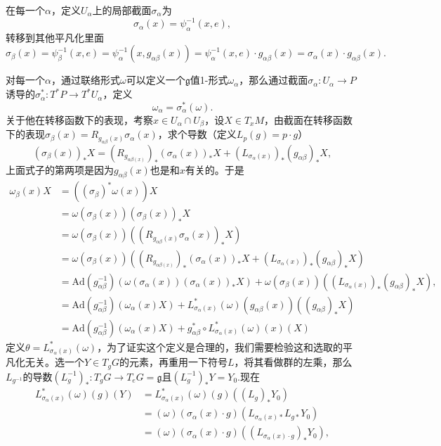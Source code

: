 在每一个$\alpha$，定义$U_\alpha$上的局部截面$\sigma_\alpha$为
\[
	\sigma_\alpha(x)=\psi_\alpha^{-1}(x,e),
\]
转移到其他平凡化里面
\[
	\sigma_\beta(x)=\psi_\beta^{-1}(x,e)=\psi_\alpha^{-1}(x,g_{\alpha\beta}(x))=\psi_\alpha^{-1}(x,e)\cdot g_{\alpha\beta}(x)=\sigma_\alpha(x)\cdot g_{\alpha\beta}(x).
\]

对每一个$\alpha$，通过联络形式$\omega$可以定义一个$\mathfrak{g}$值1-形式$\omega_\alpha$，那么通过截面$\sigma_\alpha:U_\alpha\to P$诱导的$\sigma_\alpha^*:T^*P\to T^*U_\alpha$，定义
\[
	\omega_\alpha=\sigma_\alpha^*(\omega).
\]
关于他在转移函数下的表现，考察$x\in U_\alpha\cap U_\beta$，设$X\in T_x M$，由截面在转移函数下的表现$\sigma_\beta(x)=R_{g_{\alpha\beta}(x)}\sigma_\alpha(x)$，求个导数（定义$L_p(g)=p\cdot g$）
\[
	(\sigma_\beta(x))_*X=(R_{g_{\alpha\beta(x)}})_*(\sigma_\alpha(x))_*X+\left(L_{\sigma_\alpha(x)}\right)_*(g_{\alpha\beta})_*X,
\]
上面式子的第两项是因为$g_{\alpha\beta}(x)$也是和$x$有关的。于是
\begin{align*}
	\omega_\beta(x)X&=((\sigma_\beta)^*\omega(x))X\\
	&=\omega(\sigma_\beta(x))(\sigma_\beta(x))_*X\\
	&=\omega(\sigma_\beta(x))((R_{g_{\alpha\beta}(x)}\sigma_\alpha(x))_*X)\\
	&=\omega(\sigma_\beta(x))\left((R_{g_{\alpha\beta(x)}})_*(\sigma_\alpha(x))_*X+\left(L_{\sigma_\alpha(x)}\right)_*(g_{\alpha\beta})_*X\right)\\
	&=\mathrm{Ad}(g_{\alpha\beta}^{-1})\left(\omega(\sigma_\alpha(x))(\sigma_\alpha(x))_*X\right)+\omega(\sigma_\beta(x))\left(\left(L_{\sigma_\alpha(x)}\right)_*(g_{\alpha\beta})_*X\right),\\
	&=\mathrm{Ad}(g_{\alpha\beta}^{-1})\left(\omega_\alpha(x)X\right)+L_{\sigma_\alpha(x)}^*(\omega)(g_{\alpha\beta}(x))\left((g_{\alpha\beta})_*X\right)\\
	&=\mathrm{Ad}(g_{\alpha\beta}^{-1})\left(\omega_\alpha(x)X\right)+g_{\alpha\beta}^*\circ L_{\sigma_\alpha(x)}^*(\omega)(x)\left(X\right)
\end{align*}
定义$\theta=L_{\sigma_\alpha(x)}^*(\omega)$，为了证实这个定义是合理的，我们需要检验这和选取的平凡化无关。选一个$Y\in T_g G$的元素，再重用一下符号$L$，将其看做群的左乘，那么$L_{g^{-1}}$的导数$(L_g^{-1})_* :T_g G\to T_e G=\mathfrak{g}$且$(L_g^{-1})_*Y=Y_0$.现在
\begin{align*}
	L_{\sigma_\alpha(x)}^*(\omega)(g)(Y)&=L_{\sigma_\alpha(x)}^*(\omega)(g)((L_g)_*Y_0)\\
	&=(\omega)(\sigma_\alpha(x)\cdot g)\left(L_{\sigma_\alpha(x)*}L_{g*}Y_0\right)\\
	&=(\omega)(\sigma_\alpha(x)\cdot g)\left(\left(L_{\sigma_\alpha(x)\cdot g}\right)_*Y_0\right),
\end{align*}
